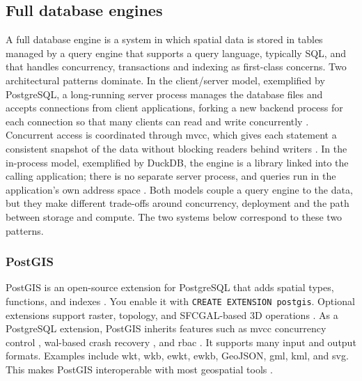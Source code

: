 \subsection{Full database engines}
\label{sec:database-engines}
A full database engine is a system in which spatial data is stored in tables managed by a query engine that supports a query language, typically SQL, and that handles concurrency, transactions and indexing as first-class concerns. Two architectural patterns dominate. In the client/server model, exemplified by PostgreSQL, a long-running server process manages the database files and accepts connections from client applications, forking a new backend process for each connection so that many clients can read and write concurrently \parencite{postgresql2024_architectural_fundamentals}. Concurrent access is coordinated through \acrfull{mvcc}, which gives each statement a consistent snapshot of the data without blocking readers behind writers \parencite{postgresql2024_concurrency_control}. In the in-process model, exemplified by DuckDB, the engine is a library linked into the calling application; there is no separate server process, and queries run in the application's own address space \parencite{raasveldt2019_duckdb_embeddable_analytical_database}. Both models couple a query engine to the data, but they make different trade-offs around concurrency, deployment and the path between storage and compute. The two systems below correspond to these two patterns.

\subsubsection{PostGIS}
PostGIS is an open-source extension for PostgreSQL that adds spatial types, functions, and indexes \parencite{postgis2024_manual_34}. You enable it with \texttt{CREATE EXTENSION postgis}. Optional extensions support raster, topology, and SFCGAL-based 3D operations \parencite{postgis2024_manual_34}. As a PostgreSQL extension, PostGIS inherits features such as \acrshort{mvcc} concurrency control \parencite{postgresql2024_concurrency_control}, \acrshort{wal}-based crash recovery \parencite{postgresql2024_wal}, and \acrfull{rbac} \parencite{postgresql2024_roles}. It supports many input and output formats. Examples include \acrshort{wkt}, \acrshort{wkb}, \acrfull{ewkt}, \acrfull{ewkb}, GeoJSON, \acrshort{gml}, \acrfull{kml}, and \acrfull{svg}. This makes PostGIS interoperable with most geospatial tools \parencite{postgis2024_manual_34}.

